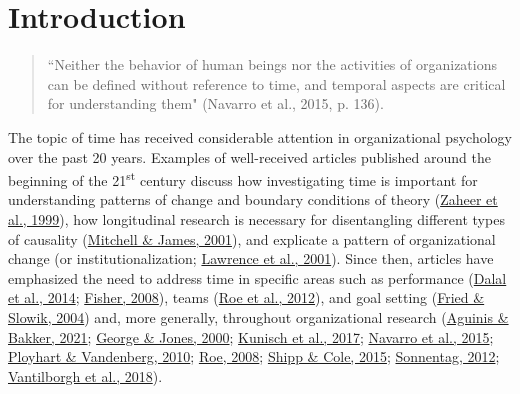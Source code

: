 \documentclass[
12pt, %
twoside,
english]{guelphthesis}
\newcommand{\setMainMatterLinespacing}{
 \setstretch{2} %

        \setstretch{2}
  }
\let\oldmainmatter\mainmatter
\renewcommand{\mainmatter}{
  \oldmainmatter

  \setMainMatterLinespacing

      \linenumbers
  
  \pagestyle{mainmatter} %

}
\newcommand{\listappname}{List of Appendices}
\begin{document}
  \listoftables
  \newpage

  \listoffigures
  \newpage

  \addcontentsline{toc}{chapter}{\listappname}
  \listofapp

  \newpage

\mainmatter %

\hypertarget{introduction}{%
\chapter{Introduction}\label{introduction}}
\begin{quote}
    ``Neither the behavior of human beings nor the activities of organizations can be defined without reference to time, and temporal aspects are critical for understanding them" (Navarro et al., 2015, p. 136).
\end{quote}
The topic of time has received considerable attention in organizational psychology over the past 20 years. Examples of well-received articles published around the beginning of the 21\textsuperscript{st} century discuss how investigating time is important for
understanding patterns of change and boundary conditions of theory
(\protect\hyperlink{ref-zaheer1999}{Zaheer et al., 1999}), how longitudinal research is necessary for disentangling
different types of causality (\protect\hyperlink{ref-mitchell2001}{Mitchell \& James, 2001}), and explicate a pattern
of organizational change (or institutionalization; \protect\hyperlink{ref-lawrence2001}{Lawrence et al., 2001}).
Since then, articles have emphasized the need to address time in
specific areas such as performance (\protect\hyperlink{ref-dalal2014}{Dalal et al., 2014}; \protect\hyperlink{ref-fisher2008}{Fisher, 2008}), teams (\protect\hyperlink{ref-roe2012}{Roe et al., 2012}), and goal setting (\protect\hyperlink{ref-fried2004}{Fried \& Slowik, 2004}) and, more generally, throughout organizational research (\protect\hyperlink{ref-aguinis2021}{Aguinis \& Bakker, 2021}; \protect\hyperlink{ref-george2000}{George \& Jones, 2000}; \protect\hyperlink{ref-kunisch2017}{Kunisch et al., 2017}; \protect\hyperlink{ref-navarro2015}{Navarro et al., 2015}; \protect\hyperlink{ref-ployhart2010}{Ployhart \& Vandenberg, 2010}; \protect\hyperlink{ref-roe2008}{Roe, 2008}; \protect\hyperlink{ref-shipp2015}{Shipp \& Cole, 2015}; \protect\hyperlink{ref-sonnentag2012}{Sonnentag, 2012}; \protect\hyperlink{ref-vantilborgh2018}{Vantilborgh et al., 2018}).
\end{document}
